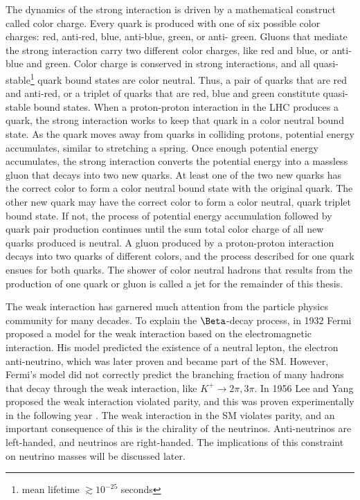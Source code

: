 The dynamics of the strong interaction is driven by a mathematical construct called color charge.  Every 
quark is produced with one of six possible color charges: red, anti-red, blue, anti-blue, green, or anti-
green.  Gluons that mediate the strong interaction carry two different color charges, like red and blue, 
or anti-blue and green.  Color charge is conserved in strong interactions, and all quasi-
stable\footnote{mean lifetime $\gtrsim 10^{-25}$ seconds} quark bound states 
are color neutral.  Thus, a pair of quarks that are red and anti-red, or a triplet of quarks that are 
red, blue and green constitute quasi-stable bound states.  When a proton-proton interaction in the LHC 
produces a quark, the strong interaction works to keep that quark in a color neutral bound state.  As the 
quark moves away from quarks in colliding protons, potential energy accumulates, similar to stretching a 
spring.  Once enough potential energy accumulates, the strong interaction converts the potential energy 
into a massless gluon that decays into two new quarks.  At least one of the two new quarks has 
the correct color to form a color neutral bound state with the original quark.  The other new quark may 
have the correct color to form a color neutral, quark triplet bound state.  If not, the process of 
potential energy accumulation followed by quark pair production continues until the sum total color 
charge of all new quarks produced is neutral.  A gluon produced by a proton-proton interaction 
decays into two quarks of different colors, and the process described for one quark ensues for both 
quarks.  The shower of color neutral hadrons that results from the production of one quark or gluon 
is called a jet for the remainder of this thesis.

The weak interaction has garnered much attention from the particle physics community for many decades.  
To explain the $\Beta$-decay process, in 1932 Fermi proposed a model for the weak interaction based on 
the electromagnetic interaction.  His model predicted the existence of a neutral lepton, the electron 
anti-neutrino, which was later proven \cite{firstNuDiscovery} and became part of the SM.  However, Fermi's 
model did not correctly predict the branching fraction of many hadrons that decay through the weak 
interaction, like $K^{+} \rightarrow 2\pi, 3\pi$.  In 1956 Lee and Yang proposed the weak interaction 
violated parity, and this was proven experimentally in the following year \cite{weakParityViolation}.  
The weak interaction in the SM violates parity, and an important consequence of this is the chirality of 
the neutrinos.  Anti-neutrinos are left-handed, and neutrinos are right-handed.  The implications of this 
constraint on neutrino masses will be discussed later.

